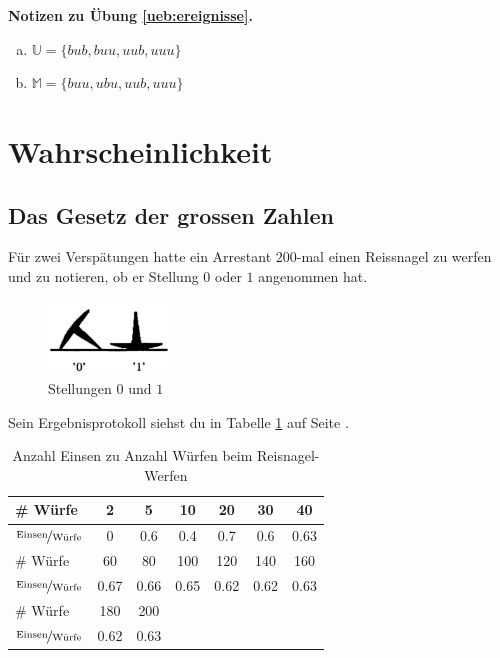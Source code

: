\documentclass[%
11pt,%
twoside,%
titlepage,%
german,%
headsepline%
]{scrartcl}
\newcommand{\spaltenheight}{\rule{0mm}{3ex}}
\newcommand{\spaltensep}{\\[1ex]}
\newcommand{\concatueb}[1]{ueb:#1}%
\newcommand{\concatlsg}[1]{lsg:#1}%
\newenvironment{lsg}[1]{%
    \par\noindent\textbf{Notizen zu Übung \ref{\concatueb{#1}}.}%
    \label{\concatlsg{#1}}
}{%
    \par%
}
\begin{document}
\begin{lsg}{ereignisse}
\begin{enumerate}[a)]
\item $\mathbb{U}=\{bub,buu,uub,uuu\}$
\item $\mathbb{M}=\{buu,ubu,uub,uuu\}$
\end{enumerate}
\end{lsg}

\clearpage

\section{Wahrscheinlichkeit}

\subsection{Das Gesetz der grossen Zahlen}

Für zwei Verspätungen hatte ein Arrestant $200$-mal einen Reissnagel zu werfen und zu notieren, ob er Stellung $0$ oder $1$ angenommen hat.
\begin{figure}
\centering
\includegraphics[width=0.3\textwidth]{pictures/reisnagel}
\caption{Stellungen $0$ und $1$}
\end{figure}
Sein Ergebnisprotokoll siehst du in Tabelle \ref{tab:arrest} auf Seite \pageref{tab:arrest}.
\begin{table}
\centering
\begin{tabular}{|l|c|c|c|c|c|c|} \hline
\rowcolor{Gray}\spaltenheight\# Würfe & 2 & 5 & 10 & 20 & 30 & 40\spaltensep \hline
\rowcolor{lightyellow}\spaltenheight$\nicefrac{\text{Einsen}}{\text{Würfe}}$ & 0 & 0.6 & 0.4 & 0.7 & 0.6 & 0.63\spaltensep \hline
\rowcolor{Gray}\spaltenheight\# Würfe & 60 & 80 & 100 & 120 & 140 & 160\spaltensep \hline
\rowcolor{lightyellow}\spaltenheight$\nicefrac{\text{Einsen}}{\text{Würfe}}$ & 0.67& 0.66 & 0.65 & 0.62 & 0.62 & 0.63\spaltensep \hline
\rowcolor{Gray}\spaltenheight\# Würfe & 180 & 200 & & & &\spaltensep \hline
\rowcolor{lightyellow}\spaltenheight$\nicefrac{\text{Einsen}}{\text{Würfe}}$ & 0.62 & 0.63 & & & &\spaltensep \hline
\end{tabular}
\caption{Anzahl Einsen zu Anzahl Würfen beim Reisnagel-Werfen}\label{tab:arrest}
\end{table}
\end{document}
